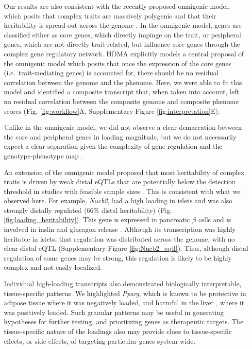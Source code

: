 \documentclass[
]{article}
\begin{document}
Our results are also consistent with the recently proposed omnigenic
model, which posits that complex traits are massively polygenic and that
their heritability is spread out across the genome \cite{pmid28622505}.
In the omnigenic model, genes are classified either as core genes, which
directly impinge on the trait, or peripheral genes, which are not
directly trait-related, but influence core genes through the complex
gene regulatory network. HDMA explicitly models a central proposal of
the omnigenic model which posits that once the expression of the core
genes (i.e.~trait-mediating genes) is accounted for, there should be no
residual correlation between the genome and the phenome. Here, we were
able to fit this model and identified a composite transcript that, when
taken into account, left no residual correlation between the composite
genome and composite phenome scores (Fig. \ref{fig:workflow}A,
Supplementary Figure \ref{fig:interpretation}E).

Unlike in the omnigenic model, we did not observe a clear demarcation
between the core and peripheral genes in loading magnitude, but we do
not necessarily expect a clear separation given the complexity of gene
regulation and the genotype-phenotype map \cite{pmid29906445}.

An extension of the omnigenic model proposed that most heritability of
complex traits is driven by weak distal eQTLs that are potentially below
the detection threshold in studies with feasible sample sizes
\cite{pmid31051098}. This is consistent with what we observed here. For
example, \textit{Nucb2}, had a high loading in islets and was also
strongly distally regulated (66\% distal heritability) (Fig.
\ref{fig:loading_heritability}). This gene is expressed in pancreatic
\(\beta\) cells and is involved in inslin and glucagon release
\cite{pmid24993278, pmid23537085, pmid22108805}. Although its
transcription was highly heritable in islets, that regulation was
distributed across the genome, with no clear distal eQTL (Supplementary
Figure \ref{fig:Nucb2_eqtl}). Thus, although distal regulation of some
genes may be strong, this regulation is likely to be highly complex and
not easily localized.

Individual high-loading transcripts also demonstrated biologically
interpretable, tissue-specific patterns. We highlighted \textit{Pparg},
which is known to be protective in adipose tissue \cite{pmid17389767}
where it was negatively loaded, and harmful in the liver
\cite{pmid12805374, pmid12618528, 
pmid16357043, pmid15644454, pmid16403437}, where it was positively
loaded. Such granular patterns may be useful in generating hypotheses
for further testing, and prioritizing genes as therapeutic targets. The
tissue-specific nature of the loadings also may provide clues to
tissue-specific effects, or side effects, of targeting particular genes
system-wide.
\end{document}
